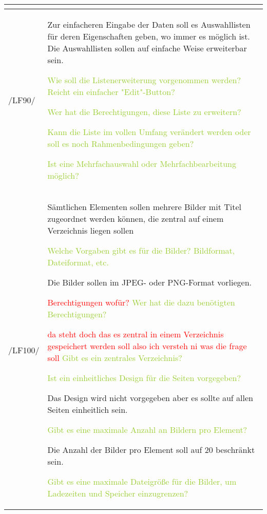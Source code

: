 \begin{tabular}[ht] {l | p{13cm}}
    \textcolor{NavyBlue}{}
    \\
    \hline
    /LF90/ & Zur einfacheren Eingabe der Daten soll es Auswahllisten für deren Eigenschaften geben, wo immer es möglich ist. Die Auswahllisten sollen auf einfache Weise erweiterbar sein. 
    
    \textcolor{YellowGreen}{Wie soll die Listenerweiterung vorgenommen werden? Reicht ein einfacher "Edit"-Button?}

    \textcolor{NavyBlue}{}

    \textcolor{YellowGreen}{Wer hat die Berechtigungen, diese Liste zu erweitern?}

    \textcolor{NavyBlue}{}

    \textcolor{YellowGreen}{Kann die Liste im vollen Umfang verändert werden oder soll es noch Rahmenbedingungen geben?}

    \textcolor{NavyBlue}{}

    \textcolor{YellowGreen}{Ist eine Mehrfachauswahl oder Mehrfachbearbeitung möglich?}

    \textcolor{NavyBlue}{}
    \\
    \hline
    /LF100/ & Sämtlichen Elementen sollen mehrere Bilder mit Titel zugeordnet werden können, die zentral auf einem Verzeichnis liegen sollen 
    
    \textcolor{YellowGreen}{Welche Vorgaben gibt es für die Bilder? Bildformat, Dateiformat, etc.}

    \textcolor{NavyBlue}{Die Bilder sollen im JPEG- oder PNG-Format vorliegen.}

    \textcolor{Red}{Berechtigungen wofür?}
    \textcolor{YellowGreen}{Wer hat die dazu benötigten Berechtigungen?}

    \textcolor{NavyBlue}{}

    \textcolor{Red}{da steht doch das es zentral in einem Verzeichnis gespeichert werden soll also ich versteh ni was die frage soll}
    \textcolor{YellowGreen}{Gibt es ein zentrales Verzeichnis?}

    \textcolor{NavyBlue}{}

    \textcolor{YellowGreen}{Ist ein einheitliches Design für die Seiten vorgegeben?}

    \textcolor{NavyBlue}{Das Design wird nicht vorgegeben aber es sollte auf allen Seiten einheitlich sein.}

    \textcolor{YellowGreen}{Gibt es eine maximale Anzahl an Bildern pro Element?}

    \textcolor{NavyBlue}{Die Anzahl der Bilder pro Element soll auf 20 beschränkt sein.}

    \textcolor{YellowGreen}{Gibt es eine maximale Dateigröße für die Bilder, um Ladezeiten und Speicher einzugrenzen?}

    \textcolor{NavyBlue}{}
    \\
    \hline
\end{tabular}

